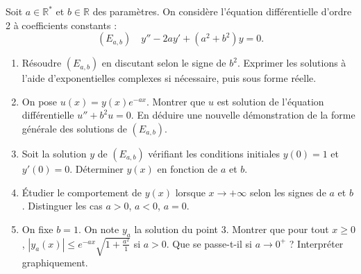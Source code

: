 \documentclass[11pt]{article}
\begin{document}
\begin{exercice}
Soit $a \in \mathbb{R}^*$ et $b \in \mathbb{R}$ des paramètres. On considère l'équation différentielle d'ordre 2 à coefficients constants :
\[(E_{a,b}) \quad y'' - 2a y' + (a^2 + b^2) y = 0.\]
\begin{enumerate}
    \item Résoudre $(E_{a,b})$ en discutant selon le signe de $b^2$. Exprimer les solutions à l'aide d'exponentielles complexes si nécessaire, puis sous forme réelle.
    \item On pose $u(x) = y(x) e^{-ax}$. Montrer que $u$ est solution de l'équation différentielle $u'' + b^2 u = 0$. En déduire une nouvelle démonstration de la forme générale des solutions de $(E_{a,b})$.
    \item Soit la solution $y$ de $(E_{a,b})$ vérifiant les conditions initiales $y(0)=1$ et $y'(0)=0$. Déterminer $y(x)$ en fonction de $a$ et $b$.
    \item Étudier le comportement de $y(x)$ lorsque $x \to +\infty$ selon les signes de $a$ et $b$. Distinguer les cas $a>0$, $a<0$, $a=0$.
    \item On fixe $b=1$. On note $y_a$ la solution du point 3. Montrer que pour tout $x \ge 0$, $|y_a(x)| \le e^{-ax} \sqrt{1 + \frac{a^2}{1}}$ si $a>0$. Que se passe-t-il si $a \to 0^+$ ? Interpréter graphiquement.
\end{enumerate}
\end{exercice}
\end{document}
